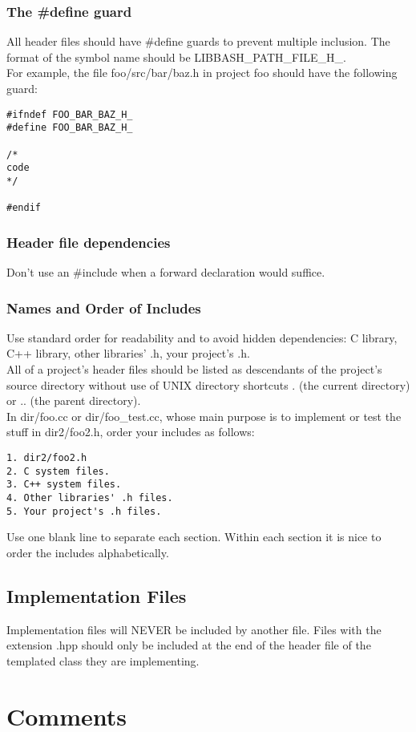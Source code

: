 \documentclass[letterpaper,10pt]{article}
\begin{document}
\subsubsection{The \#define guard}
All header files should have \#define guards to prevent multiple inclusion. The format of the symbol name should be LIBBASH\_PATH\_FILE\_H\_.\\
For example, the file foo/src/bar/baz.h in project foo should have the following guard:
\begin{verbatim}
#ifndef FOO_BAR_BAZ_H_
#define FOO_BAR_BAZ_H_

/*
code
*/

#endif
\end{verbatim}
\subsubsection{Header file dependencies}
Don't use an \#include when a forward declaration would suffice.\\
\subsubsection{Names and Order of Includes}
Use standard order for readability and to avoid hidden dependencies: C library, C++ library, other libraries' .h, your project's .h.\\
All of a project's header files should be listed as descendants of the project's source directory without use of UNIX directory shortcuts . (the current directory) or .. (the parent directory).\\
In dir/foo.cc or dir/foo\_test.cc, whose main purpose is to implement or test the stuff in dir2/foo2.h, order your includes as follows:
\begin{verbatim}
1. dir2/foo2.h
2. C system files.
3. C++ system files.
4. Other libraries' .h files.
5. Your project's .h files.
\end{verbatim}
Use one blank line to separate each section. Within each section it is nice to order the includes alphabetically.
\subsection{Implementation Files}
Implementation files will NEVER be included by another file.  Files with the extension .hpp should only be included at the end of the header file of the templated class they are implementing.
\section{Comments}
\end{document}
